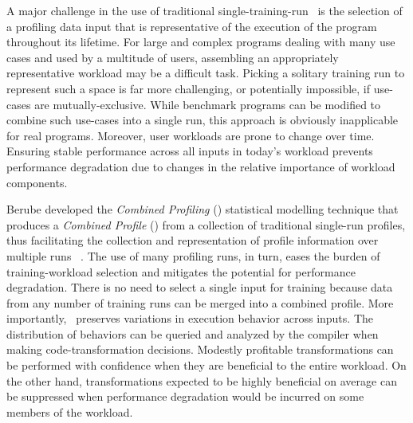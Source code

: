 

A major challenge in the use of traditional single-training-run \FDO\
is the selection of a profiling data input that is representative of
the execution of the program throughout its lifetime.  For large and
complex programs dealing with many use cases and used by a multitude
of users, assembling an appropriately representative workload may be a
difficult task.  Picking a solitary training run to represent such a
space is far more challenging, or potentially impossible, if use-cases
are mutually-exclusive.  While benchmark programs can be modified to
combine such use-cases into a single run,
this approach is obviously inapplicable for real programs.  Moreover,
user workloads are prone to change over time.  Ensuring stable
performance across all inputs in today's workload prevents performance
degradation due to changes in the relative importance of workload
components.

Berube developed the {\em Combined Profiling} (\CP) statistical modelling technique that produces a {\it Combined Profile} (\CProf)
from a collection of traditional single-run profiles, thus
facilitating the collection and representation of profile information
over multiple runs~\cite{BerubePhD} . The use of many profiling runs, in turn, eases the
burden of training-workload selection and mitigates the potential for
performance degradation.  There is no need to select a single input
for training because data from any number of training runs can be
merged into a combined profile.  More importantly, \CP\ preserves
variations in execution behavior across inputs.  The distribution of
behaviors can be queried and analyzed by the compiler when making
code-transformation decisions.  Modestly profitable transformations
can be performed with confidence when they are beneficial to the
entire workload. On the other hand, transformations expected to be
highly beneficial on average can be suppressed when performance
degradation would be incurred on some members of the workload.

